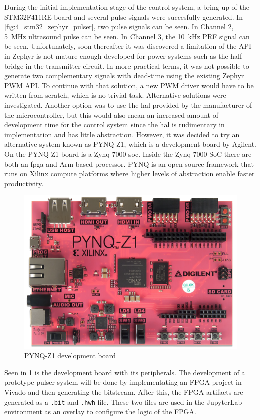 During the initial implementation stage of the control system, a bring-up of the STM32F411RE board and several pulse signals were succesfully generated. In \cref{fig:4_stm32_zephyr_pulser}, two pulse signals can be seen. In Channel 2, \qty{5}{\mega\hertz} ultrasound pulse can be seen. In Channel 3, the \qty{10}{\kilo\hertz} PRF signal can be seen. Unfortunately, soon thereafter it was discovered a limitation of the API in Zephyr is not mature enough developed for power systems such as the half-bridge in the transmitter circuit. In more practical terms, it was not possible to generate two complementary signals with dead-time using the existing Zephyr PWM API. To continue with that solution, a new PWM driver would have to be written from scratch, which is no trivial task. Alternative solutions were investigated. Another option was to use the \gls{hal} provided by the manufacturer of the microcontroller, but this would also mean an increased amount of development time for the control system since the \gls{hal} is rudimentary in implementation and has little abstraction. However, it was decided to try an alternative system known as PYNQ Z1, which is a development board by Agilent. On the PYNQ Z1 board is a Zynq 7000 \gls{soc}. Inside the Zynq 7000 SoC there are both an \gls{fpga} and Arm based processor. PYNQ is an open-source framework that runs on Xilinx compute platforms where higher levels of abstraction enable faster productivity.

\begin{figure}[htbp]
	\centering
	\includegraphics[width=.8\textwidth]{Figures/4_pynq_z1_pcb_pic.png}
	\caption{PYNQ-Z1 development board}
	\label{fig:4_pynq_z1_pcb}
\end{figure}

Seen in \cref{fig:4_pynq_z1_pcb} is the development board with its peripherals. The development of a prototype pulser system will be done by implementating an FPGA project in Vivado and then generating the \gls{bitstream}. After this, the FPGA artifacts are generated as a \texttt{.bit} and \texttt{.hwh} file. These two files are used in the JupyterLab environment as an overlay to configure the logic of the FPGA.

